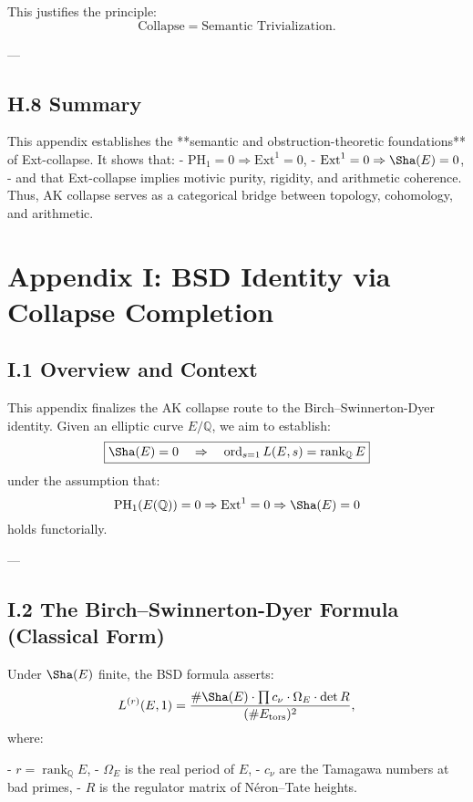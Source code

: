This justifies the principle:
\[
\text{Collapse} = \text{Semantic Trivialization}.
\]

---

\subsection*{H.8 Summary}

This appendix establishes the **semantic and obstruction-theoretic foundations** of Ext-collapse.  
It shows that:
- \( \mathrm{PH}_1 = 0 \Rightarrow \mathrm{Ext}^1 = 0 \),
- \( \mathrm{Ext}^1 = 0 \Rightarrow \Sha(E) = 0 \),
- and that Ext-collapse implies motivic purity, rigidity, and arithmetic coherence.  
Thus, AK collapse serves as a categorical bridge between topology, cohomology, and arithmetic.

\section*{Appendix I: BSD Identity via Collapse Completion}

\subsection*{I.1 Overview and Context}

This appendix finalizes the AK collapse route to the Birch–Swinnerton-Dyer identity.  
Given an elliptic curve \( E/\mathbb{Q} \), we aim to establish:
\[
\boxed{\Sha(E) = 0 \quad \Rightarrow \quad \operatorname{ord}_{s=1} L(E,s) = \operatorname{rank}_{\mathbb{Q}} E}
\]
under the assumption that:
\[
\mathrm{PH}_1(E(\mathbb{Q})) = 0 \Rightarrow \mathrm{Ext}^1 = 0 \Rightarrow \Sha(E) = 0
\]
holds functorially.

---

\subsection*{I.2 The Birch–Swinnerton-Dyer Formula (Classical Form)}

Under \( \Sha(E) \) finite, the BSD formula asserts:
\[
L^{(r)}(E, 1) = \frac{\#\Sha(E) \cdot \prod c_\nu \cdot \Omega_E \cdot \det R}{(\# E_{\text{tors}})^2},
\]
where:

- \( r = \operatorname{rank}_{\mathbb{Q}} E \),
- \( \Omega_E \) is the real period of \( E \),
- \( c_\nu \) are the Tamagawa numbers at bad primes,
- \( R \) is the regulator matrix of Néron–Tate heights.

